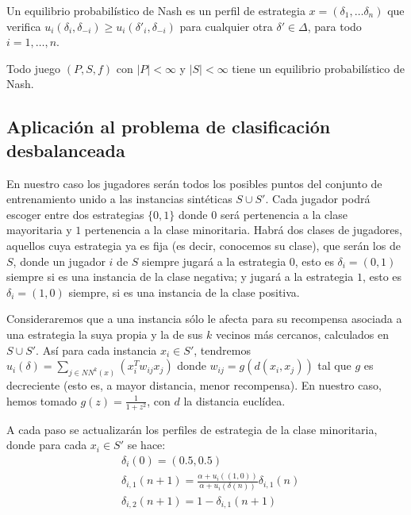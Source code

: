 \begin{definition}
Un equilibrio probabilístico de Nash es un perfil de estrategia $x = (\delta_1, \ldots \delta_n)$ que verifica 
$u_i(\delta_i, \delta_{-i}) \ge u_i(\delta'_{i}, \delta_{-i})$ para cualquier otra $\delta'\in \Delta$, para todo $i=1, \ldots, n$.
\end{definition}

\begin{theorem}
 Todo juego $(P,S,f)$ con $|P| < \infty$ y $|S| < \infty$ tiene un equilibrio probabilístico de Nash.
\end{theorem}

\subsection{Aplicación al problema de clasificación desbalanceada}
En nuestro caso los jugadores serán todos los posibles puntos del conjunto de entrenamiento unido a las instancias 
sintéticas $S \cup S'$. Cada jugador podrá escoger entre dos estrategias $\{0,1\}$ donde $0$ será pertenencia a la clase 
mayoritaria y $1$ pertenencia a la clase minoritaria. Habrá dos clases de jugadores, aquellos cuya estrategia ya es fija (es
decir, conocemos su clase), que serán los de $S$, donde un jugador $i$ de $S$ siempre jugará a la estrategia $0$, esto es 
$\delta_i = (0,1)$ siempre si es una instancia de la clase negativa; y jugará a la estrategia $1$, esto es 
$\delta_i = (1,0)$ siempre, si es una instancia de la clase positiva.

Consideraremos que a una instancia sólo le afecta para su recompensa asociada a una estrategia la suya propia y la de sus
$k$ vecinos más cercanos, calculados en $S\cup S'$. Así para cada instancia $x_i \in S'$, tendremos $u_i(\delta) = \sum_{j\in NN^k(x)} (x_i^T w_{ij} x_j)$ donde
$w_{ij} = g\left(d(x_i, x_j)\right)$ tal que $g$ es decreciente (esto es, a mayor distancia, menor recompensa). En nuestro
caso, hemos tomado $g(z) = \frac{1}{1+z^2}$, con $d$ la distancia euclídea.

A cada paso se actualizarán los perfiles de estrategia de la clase minoritaria, donde para cada $x_i\in S'$ se hace: 
\begin{align*}
& \delta_i(0) = (0.5, 0.5)\\
& \delta_{i,1}(n+1) = \frac{\alpha + u_i((1,0))}{\alpha + u_i(\delta(n))} \delta_{i,1}(n)\\
& \delta_{i,2}(n+1) = 1 - \delta_{i,1}(n+1)
\end{align*}

